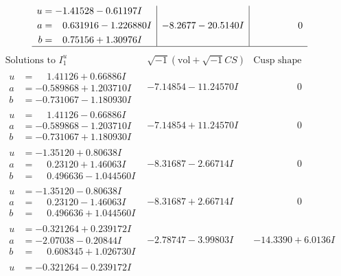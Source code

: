 \documentclass[1p]{elsarticle_modified}
\theoremstyle{definition}
\newcommand{\I}{\sqrt{-1}}
\begin{document}
$$\begin{array}{c|c|c}
\begin{aligned}
u &= -1.41528 - 0.61197 I \\
a &= \phantom{-}0.631916 - 1.226880 I \\
b &= \phantom{-}0.75156 + 1.30976 I\end{aligned}
 & -8.2677 - 20.5140 I & \phantom{-0.000000 } 0\\
 \hline 
 \end{array}$$\newpage$$\begin{array}{c|c|c}  
\text{Solutions to }I^u_{1}& \I (\text{vol} + \sqrt{-1}CS) & \text{Cusp shape}\\
 \hline 
\begin{aligned}
u &= \phantom{-}1.41126 + 0.66886 I \\
a &= -0.589868 + 1.203710 I \\
b &= -0.731067 - 1.180930 I\end{aligned}
 & -7.14854 - 11.24570 I & \phantom{-0.000000 } 0 \\ \hline\begin{aligned}
u &= \phantom{-}1.41126 - 0.66886 I \\
a &= -0.589868 - 1.203710 I \\
b &= -0.731067 + 1.180930 I\end{aligned}
 & -7.14854 + 11.24570 I & \phantom{-0.000000 } 0 \\ \hline\begin{aligned}
u &= -1.35120 + 0.80638 I \\
a &= \phantom{-}0.23120 + 1.46063 I \\
b &= \phantom{-}0.496636 - 1.044560 I\end{aligned}
 & -8.31687 - 2.66714 I & \phantom{-0.000000 } 0 \\ \hline\begin{aligned}
u &= -1.35120 - 0.80638 I \\
a &= \phantom{-}0.23120 - 1.46063 I \\
b &= \phantom{-}0.496636 + 1.044560 I\end{aligned}
 & -8.31687 + 2.66714 I & \phantom{-0.000000 } 0 \\ \hline\begin{aligned}
u &= -0.321264 + 0.239172 I \\
a &= -2.07038 - 0.20844 I \\
b &= \phantom{-}0.608345 + 1.026730 I\end{aligned}
 & -2.78747 - 3.99803 I & -14.3390 + 6.0136 I \\ \hline\begin{aligned}
u &= -0.321264 - 0.239172 I \\

\end{aligned}
\end{array}$$
\end{document}
